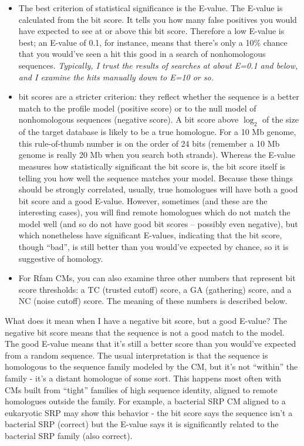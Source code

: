 \begin{itemize}
\item The best criterion of statistical significance is the E-value.
The E-value is calculated from the bit score. It tells you how many
false positives you would have expected to see at or above this bit
score. Therefore a low E-value is best; an E-value of 0.1, for
instance, means that there's only a 10\% chance that you would've seen
a hit this good in a search of nonhomologous sequences. {\em
Typically, I trust the results of searches at about E=0.1 and
below, and I examine the hits manually down to E=10 or so.}

\item {} bit scores are a stricter criterion: they
  reflect whether the sequence is a better match to the profile model
  (positive score) or to the null model of nonhomologous sequences
  (negative score).  A bit score above $\log_2$ of the size of the
  target database is likely to be a true
  homologue. For a 10 Mb genome, this rule-of-thumb number is on
  the order of 24 bits (remember a 10 Mb genome is really 20 Mb when
  you search both strands).  Whereas the E-value measures how
  statistically significant the bit score is, the bit score itself is
  telling you how well the sequence matches your model. Because these
  things should be strongly correlated, usually, true homologues will
  have both a good bit score and a good E-value. However, sometimes
  (and these are the interesting cases), you will find remote
  homologues which do not match the model well (and so do not have
  good bit scores -- possibly even negative), but which nonetheless
  have significant E-values, indicating that the bit score, though
  ``bad'', is still better than you would've expected by chance, so it
  is suggestive of homology.

\item For Rfam CMs, you can also examine three other numbers that
represent bit score thresholds: a TC (trusted cutoff) score, a GA
(gathering) score, and a NC (noise cutoff) score. The meaning of
these numbers is described below.
\end{itemize}

\begin{srefaq}{What does it mean when I have a negative bit score,
but a good E-value?} The negative bit score means that the sequence is
not a good match to the model. The good E-value means that it's still
a better score than you would've expected from a random sequence. The
usual interpretation is that the sequence is homologous to the
sequence family modeled by the CM, but it's not ``within'' the family
- it's a distant homologue of some sort. This happens most often with
CMs built from ``tight'' families of high sequence identity, aligned
to remote homologues outside the family. For example, a bacterial SRP
CM aligned to a eukaryotic SRP may show this behavior - the bit
score says the sequence isn't a bacterial SRP (correct) but the E-value says
it is significantly related to the bacterial SRP family (also correct).
\end{srefaq}

